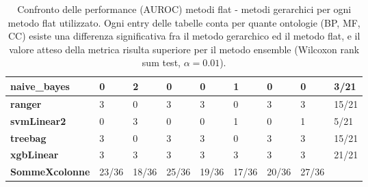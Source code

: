 \documentclass[12pt]{report}
\begin{document}
\begin{appendices}
\begin{table}[h!]
{\begin{tabular}{|l|l|l|l|l|l|l|l|l|}
\textbf{naive\_bayes}  & 0             & 2            & 0               & 0                   & 1               & 0                   & 0              & 3/21                 \\ \hline
\textbf{ranger}        & 3             & 0            & 3               & 3                   & 0               & 3                   & 3              & 15/21                \\ \hline
\textbf{svmLinear2}    & 0             & 3            & 0               & 0                   & 1               & 0                   & 1              & 5/21                 \\ \hline
\textbf{treebag}       & 3             & 0            & 3               & 3                   & 0               & 3                   & 3              & 15/21                \\ \hline
\textbf{xgbLinear}     & 3             & 3            & 3               & 3                   & 3               & 3                   & 3              & 21/21                \\ \hline
\textbf{SommeXcolonne} & 23/36         & 18/36        & 25/36           & 19/36               & 17/36           & 20/36               & 27/36          &                      \\ \hline
\end{tabular}}
\caption{\footnotesize{Confronto delle performance (AUROC) metodi flat - metodi gerarchici per ogni metodo flat utilizzato. Ogni entry delle tabelle conta per quante ontologie (BP, MF, CC) esiste una differenza significativa fra il metodo gerarchico ed il metodo flat, e il valore atteso della metrica risulta superiore per il metodo ensemble (Wilcoxon rank sum test, $\alpha = 0.01$).}}
\label{AUROC_1_}
\end{table}


\end{appendices}
\end{document}
